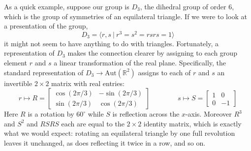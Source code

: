 \documentclass{tufte-handout-tai}
\theoremstyle{plain}
\theoremstyle{definition}
\theoremstyle{remark}
\begin{document}
As a quick example, suppose our group is $D_3$, the dihedral group of order $6$, which is the group of symmetries of an equilateral triangle. If we were to look at a presentation of the group,
\[D_3=\langle r,s \:|\: r^3=s^2=rsrs=1 \rangle\]
it might not seem to have anything to do with triangles. Fortunately, a representation of $D_3$ makes the connection clearer by assigning to each group element $r$ and $s$ a linear transformation of the real plane. Specifically, the standard representation of $D_3\to \text{Aut}(\mathbb{R}^2)$ assigns to each of $r$ and $s$ an invertible $2\times 2$ matrix with real entries:
\[r\mapsto R=\begin{bmatrix}\cos(2\pi/3) & -\sin(2\pi/3)\\ \sin(2\pi/3) & \cos(2\pi/3)\end{bmatrix}
\qquad\qquad
s\mapsto S=\begin{bmatrix}1 & 0\\ 0 & -1\end{bmatrix}
\]
Here $R$ is a rotation by $60^\circ$ while $S$ is reflection across the $x$-axis. Moreover $R^3$ and $S^2$ and $RSRS$ each are equal to the $2\times 2$ identity matrix, which is exactly what we would expect: rotating an equilateral triangle by one full revolution leaves it unchanged, as does reflecting it twice in a row, and so on.
\end{document}
